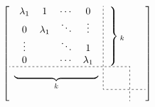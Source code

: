 \documentclass{article}
\begin{document}
\[
\left[
\setlength{\dashlinedash}{2pt}
\setlength{\dashlinegap}{2pt}
\begin{array}{c:cc}
\begin{array}{cccc}
\lambda_{1} & 1 & \cdots & 0 \\
0 & \lambda_{1} & \ddots & \vdots \\
\vdots & & \ddots & 1 \\
0 & & \cdots & \lambda_{1}
\end{array} & \left.{\vphantom{\begin{array}{cccc}
\lambda_{1} & 1 & \cdots & 0 \\
0 & \lambda_{1} & \ddots & \vdots \\
\vdots & & \ddots & 1 \\
0 & & \cdots & \lambda_{1}
\end{array}}}\right\}{}_k & \\
\cdashline{1-2}
\underbrace{\hphantom{\begin{array}{cccc}
\lambda_{1} & 1 & \cdots & 0 \\
0 & \lambda_{1} & \ddots & \vdots \\
\vdots & & \ddots & 1 \\
0 & & \cdots & \lambda_{1}
\end{array}}}_{k} & \multicolumn{1}{c:}{\phantom{x}} \\
\cdashline{2-3}
\multicolumn{2}{c:}{\phantom{x}} & {\phantom{x}}
\end{array}
\right]
\] 
\end{document}
